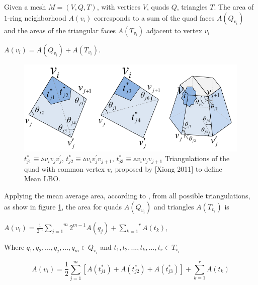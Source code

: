 \documentclass[10pt, conference]{IEEEtran}
\begin{document}
Given a mesh $M=\left(V,Q,T\right)$, with vertices $V$, quads $Q$,
triangles $T$. The area of $1$-ring neighborhood $A\left(v_{i}\right)$
corresponds to a sum of the quad faces $A\left(Q_{v_{i}}\right)$
and the areas of the triangular faces $\ensuremath{A\left(T_{v_{i}}\right)}$
adjacent to vertex $\ensuremath{v_{i}}$

\begin{center}
$A\left(v_{i}\right)=A\left(Q_{v_{i}}\right)+A\left(T_{v_{i}}\right)$.
\par\end{center}

\begin{figure}[h]
\includegraphics[width=1\columnwidth]{figs/quad_xiong}

\caption{\label{fig:quad_xiong}$t_{j1}^{*}\equiv\vartriangle v_{i}v_{j}v_{j}^{\prime},\, t_{j2}^{*}\equiv\vartriangle v_{i}v_{j}^{\prime}v_{j+1},\, t_{j3}^{*}\equiv\vartriangle v_{i}v_{j}v_{j+1}$
Triangulations of the quad with common vertex $v_{i}$ proposed by
{[}Xiong 2011{]} to define Mean LBO.}
\end{figure}


Applying the mean average area, according to \cite{Xiong2011}, from
all possible triangulations, as show in figure \ref{fig:quad_xiong},
the area for quads $\ensuremath{A\left(Q_{v_{i}}\right)}$ and triangles
$A\left(T_{v_{i}}\right)$ is

\begin{center}
$A\left(v_{i}\right)=\frac{1}{2^{m}}\overset{m}{\underset{j=1}{\sum}}2^{m-1}A\left(q_{j}\right)+\overset{r}{\underset{k=1}{\sum}}A\left(t_{k}\right)$, 
\par\end{center}

Where $q_{1},q_{2},...,q_{j},...,q_{m}\in Q_{v_{i}}$ and $t_{1},t_{2},...,t_{k},...,t_{r}\in T_{v_{i}}$

\begin{equation}
A\left(v_{i}\right)=\frac{1}{2}\overset{m}{\underset{j=1}{\sum}}\left[A\left(t_{j1}^{*}\right)+A\left(t_{j2}^{*}\right)+A\left(t_{j3}^{*}\right)\right]+\overset{r}{\underset{k=1}{\sum}}A\left(t_{k}\right)\label{eq:area_1_ring_triangles_quads}
\end{equation}
\end{document}

